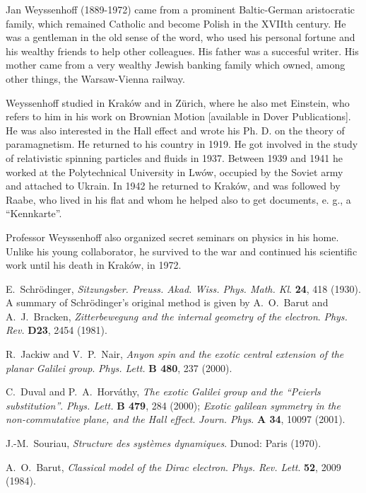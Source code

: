 \documentclass[a4paper,11pt]{article}
\begin{document}
\begin{thebibliography}{99}
Jan Weyssenhoff (1889-1972) came from a prominent
Baltic-German aristocratic family, which remained
Catholic and become Polish in the XVIIth century.
He was a gentleman in the old sense of the word, who
used his personal fortune and his wealthy
friends to help other colleagues.
His father was a succesful writer. His mother came from a
very wealthy Jewish banking family which owned, among other things,
the Warsaw-Vienna railway.

Weyssenhoff studied in Krak\'ow and in Z\"urich,
where he also met Einstein,
who refers to him in his work on Brownian Motion
[available in Dover Publications].
He was also interested in the Hall effect and wrote his Ph. D.
on the theory of paramagnetism. He returned to his country in 1919.
   He got involved in the study of relativistic spinning particles
   and fluids in 1937.
  Between 1939 and 1941 he worked at the
Polytechnical University in  Lw\'ow, occupied by the Soviet
army and attached to Ukrain.
In 1942 he returned to Krak\'ow, and was
followed by Raabe, who lived in his flat and
whom he helped also to get documents, e. g., a ``Kennkarte''.

Professor Weyssenhoff also organized secret seminars on physics in his home.
Unlike his young collaborator, he survived to the war
and continued his scientific work until
his death in Krak\'ow,  in 1972.

E.~Schr\"odinger,
{\sl Sitzungsber. Preuss. Akad. Wiss.
Phys. Math. Kl}. {\bf 24}, 418 (1930). A summary of
Schr\"odinger's original method is given by
A.~O.~Barut and A.~J.~Bracken,
{\it Zitterbewegung and the internal geometry of the
electron}.
{\sl Phys. Rev.} {\bf D23}, 2454 (1981).

R.~Jackiw and V.~P.~Nair,
{\it Anyon spin and the exotic central extension of the
   planar Galilei group}.
{\sl Phys. Lett.} {\bf B 480}, 237 (2000).

C.~Duval and P.~A.~Horv\'athy,
  {\it The exotic Galilei group and the ``Peierls substitution''}.
{\sl Phys. Lett.} {\bf B 479}, 284 (2000);
  {\it Exotic galilean symmetry in the non-commutative plane, and the
Hall effect}.
{\sl Journ. Phys}. {\bf A 34}, 10097 (2001).

J.-M.~Souriau,
{\it Structure des syst\`emes dynamiques}.
Dunod: Paris (1970).

A.~O.~Barut,
{\it Classical model of the Dirac electron}.
{\sl Phys. Rev. Lett}. {\bf 52}, 2009 (1984).


\end{thebibliography}
\end{document}
